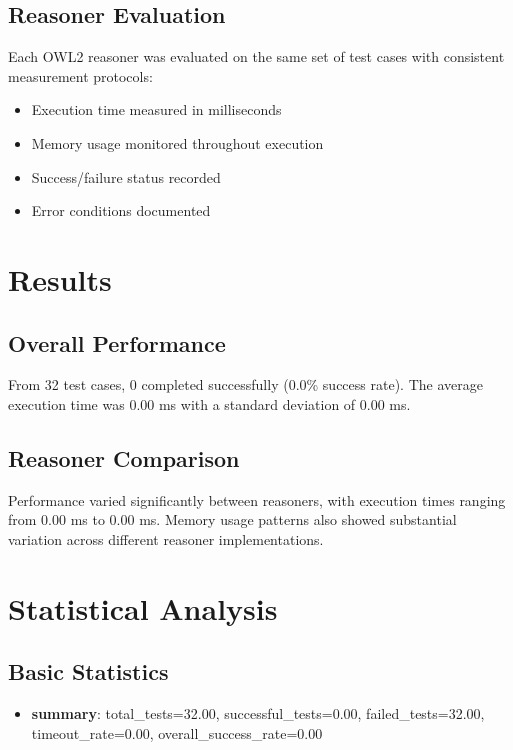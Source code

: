 \documentclass[11pt,a4paper]{{article}}
\begin{document}
\subsection{Reasoner Evaluation}
Each OWL2 reasoner was evaluated on the same set of test cases with consistent measurement protocols:
\begin{itemize}
    \item Execution time measured in milliseconds
    \item Memory usage monitored throughout execution
    \item Success/failure status recorded
    \item Error conditions documented
\end{itemize}


\section{Results}

\subsection{Overall Performance}
From 32 test cases, 0 completed successfully (0.0\% success rate). The average execution time was 0.00 ms with a standard deviation of 0.00 ms.

\subsection{Reasoner Comparison}
Performance varied significantly between reasoners, with execution times ranging from 0.00 ms to 0.00 ms. Memory usage patterns also showed substantial variation across different reasoner implementations.


\section{Statistical Analysis}

\subsection{Basic Statistics}
\begin{itemize}
    \item \textbf{summary}: total_tests=32.00, successful_tests=0.00, failed_tests=32.00, timeout_rate=0.00, overall_success_rate=0.00
\end{itemize}
\end{document}
